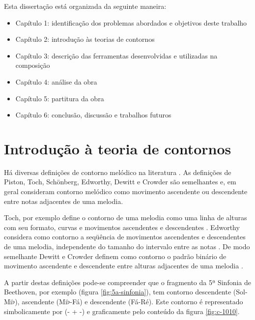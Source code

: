 Esta dissertação está organizada da seguinte maneira:

\begin{itemize}
\item Capítulo 1: identificação dos problemas abordados e objetivos
  deste trabalho
\item Capítulo 2: introdução às teorias de contornos
\item Capítulo 3: descrição das ferramentas desenvolvidas e utilizadas
  na composição
\item Capítulo 4: análise da obra \obra{}
\item Capítulo 5: partitura da obra \obra{}
\item Capítulo 6: conclusão, discussão e trabalhos futuros
\end{itemize}

\chapter{Introdução à teoria de contornos}
\label{cha:introducao-teoria-contornos}

Há diversas definições de contorno melódico na literatura
\cite{piston59:harmony,toch77:shaping,schonberg:fundamentals,adams76:melodic,edworthy85:musical,dewitt.ea86:recognition,marvin.ea87:relating,morris87:composition,clifford95:contour,beard03:contour}.
As definições de Piston, Toch, Schönberg, Edworthy, Dewitt e Crowder
são semelhantes e, em geral consideram contorno melódico como
movimento ascendente ou descendente entre notas adjacentes de uma
melodia.

Toch, por exemplo define o contorno de uma melodia como uma linha de
alturas com seu formato, curvas e movimentos ascendentes e
descendentes \cite[p. 62]{toch77:shaping}. Edworthy considera como
contorno a seqüência de movimentos ascendentes e descendentes de uma
melodia, independente do tamanho do intervalo entre as notas
\cite{edworthy85:musical}. De modo semelhante Dewitt e Crowder definem
como contorno o padrão binário de movimento ascendente e descendente
entre alturas adjacentes de uma melodia
\cite{dewitt.ea86:recognition}.

A partir destas definições pode-se compreender que o fragmento da 5ª
Sinfonia de Beethoven, por exemplo (figura \ref{fig:5a-sinfonia}), tem
contorno descendente (Sol-Mi$\flat$), ascendente (Mi$\flat$-Fá) e
descendente (Fá-Ré). Este contorno é representado simbolicamente por
(- + -) e graficamente pelo conteúdo da figura \ref{fig:c-1010}.

